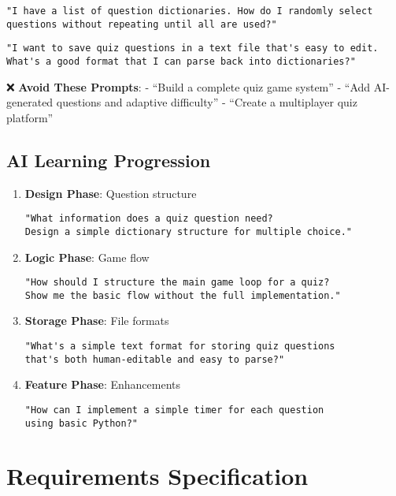 \documentclass[
  letterpaper,
  DIV=11,
  numbers=noendperiod,
  oneside]{scrreprt}
\begin{document}
\begin{verbatim}
"I have a list of question dictionaries. How do I randomly select 
questions without repeating until all are used?"
\end{verbatim}

\begin{verbatim}
"I want to save quiz questions in a text file that's easy to edit. 
What's a good format that I can parse back into dictionaries?"
\end{verbatim}

❌ \textbf{Avoid These Prompts}: - ``Build a complete quiz game system''
- ``Add AI-generated questions and adaptive difficulty'' - ``Create a
multiplayer quiz platform''

\subsection{AI Learning Progression}\label{ai-learning-progression-7}

\begin{enumerate}
\def\labelenumi{\arabic{enumi}.}
\item
  \textbf{Design Phase}: Question structure

\begin{verbatim}
"What information does a quiz question need? 
Design a simple dictionary structure for multiple choice."
\end{verbatim}
\item
  \textbf{Logic Phase}: Game flow

\begin{verbatim}
"How should I structure the main game loop for a quiz? 
Show me the basic flow without the full implementation."
\end{verbatim}
\item
  \textbf{Storage Phase}: File formats

\begin{verbatim}
"What's a simple text format for storing quiz questions 
that's both human-editable and easy to parse?"
\end{verbatim}
\item
  \textbf{Feature Phase}: Enhancements

\begin{verbatim}
"How can I implement a simple timer for each question 
using basic Python?"
\end{verbatim}
\end{enumerate}

\section{Requirements Specification}\label{requirements-specification-7}
\end{document}
